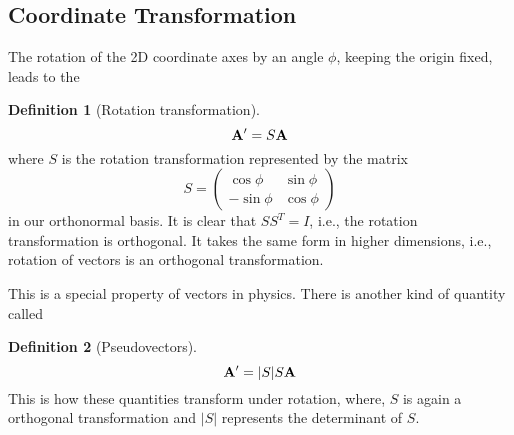 \documentclass[10pt, a4paper]{extarticle}
\theoremstyle{definition}
\newtheorem{defn}{Definition}
\begin{document}
\subsection{Coordinate Transformation}
The rotation of the 2D coordinate axes by an angle $\phi$, keeping the origin fixed, leads to the
\begin{framed}
	\begin{defn}[Rotation transformation]
		\[\vb{A'}=S\vb{A}\]
		where $S$ is the rotation transformation represented by the matrix
		\[S=\left(\begin{matrix}
					\cos\phi  & \sin\phi \\
					-\sin\phi & \cos\phi
				\end{matrix}\right)\] in our orthonormal basis.
		It is clear that $SS^T=I$, i.e., the rotation transformation is orthogonal. It takes the same form in higher dimensions, i.e., rotation of vectors is an orthogonal transformation.
	\end{defn}
\end{framed}
This is a special property of vectors in physics. There is another kind of quantity called
\begin{framed}
	\begin{defn}[Pseudovectors]
		\[\vb{A'}=|S|S\vb{A}\]
		This is how these quantities transform under rotation, where, $S$ is again a orthogonal transformation and $|S|$ represents the determinant of $S$.
	\end{defn}
\end{framed}
\end{document}
